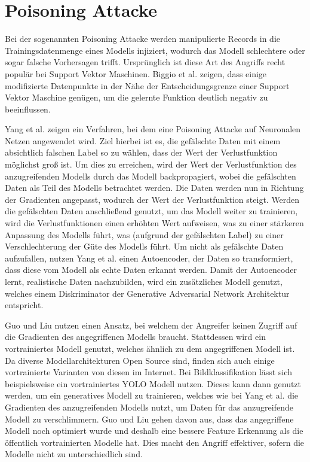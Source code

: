 \section{Poisoning Attacke}\label{sec:poisoning}

Bei der sogenannten Poisoning Attacke werden manipulierte Records in die Trainingsdatenmenge eines Modells injiziert, wodurch das Modell schlechtere oder sogar falsche Vorhersagen trifft.
Ursprünglich ist diese Art des Angriffs recht populär bei Support Vektor Maschinen.
Biggio et al. \cite{P-15} zeigen, dass einige modifizierte Datenpunkte in der Nähe der Entscheidungsgrenze einer Support Vektor Maschine genügen, um die gelernte Funktion deutlich negativ zu beeinflussen.

Yang et al. \cite{P-17} zeigen ein Verfahren, bei dem eine Poisoning Attacke auf Neuronalen Netzen angewendet wird.
Ziel hierbei ist es, die gefälschte Daten mit einem absichtlich falschen Label so zu wählen, dass der Wert der Verlustfunktion möglichst groß ist. 
Um dies zu erreichen, wird der Wert der Verlustfunktion des anzugreifenden Modells durch das Modell backpropagiert, wobei die gefälschten Daten als Teil des Modells betrachtet werden. 
Die Daten werden nun in Richtung der Gradienten angepasst, wodurch der Wert der Verlustfunktion steigt.
Werden die gefälschten Daten anschließend genutzt, um das Modell weiter zu trainieren, wird die Verlustfunktionen einen erhöhten Wert aufweisen, was zu einer stärkeren Anpassung des Modells führt, was (aufgrund der gefälschten Label) zu einer Verschlechterung der Güte des Modells führt.
Um nicht als gefälschte Daten aufzufallen, nutzen Yang et al. \cite{P-17} einen Autoencoder, der Daten so transformiert, dass diese vom Modell als echte Daten erkannt werden.
Damit der Autoencoder lernt, realistische Daten nachzubilden, wird ein zusätzliches Modell genutzt, welches einem Diskriminator der Generative Adversarial Network Architektur \cite{P-86} entspricht.

Guo und Liu \cite{P-16} nutzen einen Ansatz, bei welchem der Angreifer keinen Zugriff auf die Gradienten des angegriffenen Modells braucht.
Stattdessen wird ein vortrainiertes Modell genutzt, welches ähnlich zu dem angegriffenen Modell ist. 
Da diverse Modellarchitekturen Open Source sind, finden sich auch einige vortrainierte Varianten von diesen im Internet.
Bei Bildklassifikation lässt sich beispielsweise ein vortrainiertes YOLO Modell nutzen.
Dieses kann dann genutzt werden, um ein generatives Modell zu trainieren, welches wie bei Yang et al. \cite{P-17} die Gradienten des anzugreifenden Modells nutzt, um Daten für das anzugreifende Modell zu verschlimmern.
Guo und Liu \cite{P-16} gehen davon aus, dass das angegriffene Modell noch optimiert wurde und deshalb eine bessere Feature Erkennung als die öffentlich vortrainierten Modelle hat.
Dies macht den Angriff effektiver, sofern die Modelle nicht zu unterschiedlich sind.

